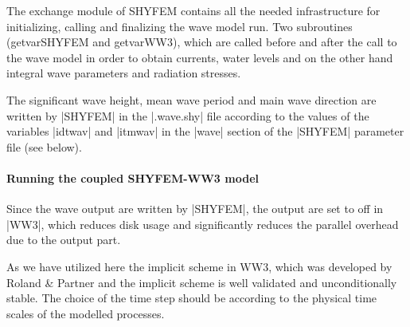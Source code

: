 The exchange module of SHYFEM contains all the needed infrastructure
for initializing, calling and finalizing the wave model run. Two
subroutines (getvarSHYFEM and getvarWW3), which are called before and
after the call to the wave model in order to obtain currents, water
levels and on the other hand integral wave parameters and radiation
stresses.

The significant wave height, mean wave period and main wave 
direction are written by |SHYFEM| in the |.wave.shy| file according
to the values of the variables |idtwav| and |itmwav| in the |wave|
section of the |SHYFEM| parameter file (see below).

\paragraph{Running the coupled SHYFEM-WW3 model}
Since the wave output are written by |SHYFEM|, the output are
set to off in |WW3|, which reduces disk usage and significantly reduces 
the parallel overhead due to the output part. 

As we have utilized here the implicit scheme in WW3, which was
developed by Roland \& Partner and the implicit scheme is well
validated and unconditionally stable. The choice of the time step
should be according to the physical time scales of the modelled
processes. 

